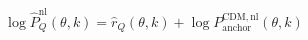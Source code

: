 \documentclass{article}
\begin{document}
\begin{equation*}
\log \widehat P_Q^{\mathrm{nl}}(\theta,k)=\widehat r_Q(\theta,k)+\log P_{\mathrm{anchor}}^{\mathrm{CDM,nl}}(\theta,k)
\end{equation*}
\end{document}
